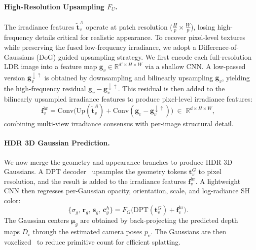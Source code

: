\documentclass[runningheads]{llncs}
\begin{document}
\paragraph{\textbf{High-Resolution Upsampling $F_U$.}}
The irradiance features $\tilde{\boldsymbol{t}}_v^{A}$ operate at patch resolution ($\tfrac{H}{p} \times \tfrac{W}{p}$), losing high-frequency details critical for realistic appearance.
To recover pixel-level textures while preserving the fused low-frequency irradiance, we adopt a Difference-of-Gaussians (DoG) guided upsampling strategy.
We first encode each full-resolution LDR image into a feature map $\mathbf{g}_v \in \mathbb{R}^{d'\times H \times W}$ via a shallow CNN.
A low-passed version $\mathbf{g}_v^{\downarrow\uparrow}$ is obtained by downsampling and bilinearly upsampling $\mathbf{g}_v$, yielding the high-frequency residual $\mathbf{g}_v - \mathbf{g}_v^{\downarrow\uparrow}$.
This residual is then added to the bilinearly upsampled irradiance features to produce pixel-level irradiance features:
\begin{equation}
    \boldsymbol{f}_v^{\text{hr}}
    = \mathrm{Conv}\!\bigl(
      \mathrm{Up}(\tilde{\boldsymbol{t}}_v^{A})
      + \mathrm{Conv}(\mathbf{g}_v - \mathbf{g}_v^{\downarrow\uparrow})
    \bigr)
    \;\in\; \mathbb{R}^{d \times H \times W},
\label{eq:upsample}
\end{equation}
combining multi-view irradiance consensus with per-image structural detail.


\paragraph{\textbf{HDR 3D Gaussian Prediction.}}
We now merge the geometry and appearance branches to produce HDR 3D Gaussians.
A DPT decoder~\cite{ranftl2021vision} upsamples the geometry tokens $\boldsymbol{t}_v^{G}$ to pixel resolution, and the result is added to the irradiance features $\boldsymbol{f}_v^{\text{hr}}$.
A lightweight CNN then regresses per-Gaussian opacity, orientation, scale, and log-radiance SH color:
\begin{equation}
    \{\sigma_g,\, \boldsymbol{r}_g,\, \boldsymbol{s}_g,\, \boldsymbol{c}_g^{h}\}
    = F_G\!\bigl(\mathrm{DPT}(\boldsymbol{t}_v^{G}) + \boldsymbol{f}_v^{\text{hr}}\bigr).
\end{equation}
The Gaussian centers $\boldsymbol{\mu}_g$ are obtained by back-projecting the predicted depth maps $D_v$ through the estimated camera poses $p_v$.
The Gaussians are then voxelized~\cite{jiang2025anysplat} to reduce primitive count for efficient splatting.
\end{document}
